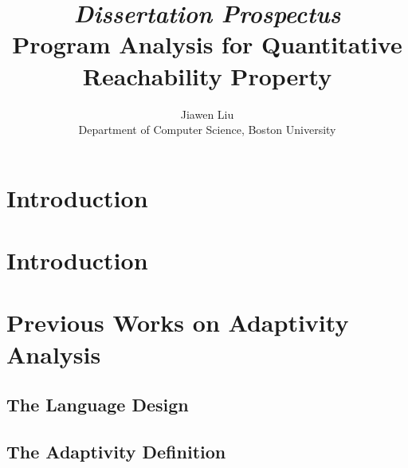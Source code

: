 \documentclass[a4paper,11pt]{article}
\begin{document}
\title{{\em Dissertation Prospectus}
\\
{Program Analysis for Quantitative Reachability Property}
}

\author{Jiawen Liu\\ Department of Computer Science, Boston University}
\maketitle
\begin{abstract}

\end{abstract}

\clearpage
\tableofcontents{}

\clearpage
\section{Introduction}
\label{sec:introduction}


\section*{ }
%

\section{Introduction}
\label{sec:adapt-intro}


\section{Previous Works on Adaptivity Analysis}
\label{sec:prework}

\subsection{The Language Design}
\label{sec:prework-language}

%
\subsection{The Adaptivity Definition}
\label{sec:prework-formalization}

%
\end{document}
